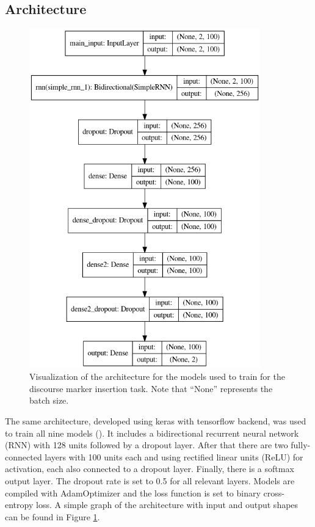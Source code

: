 \subsection{Architecture}

\begin{figure}
    \centering
    \includegraphics[width = 10cm]{Figures/graph.png}
    \caption{Visualization of the architecture for the models used to train for the discourse marker insertion task. Note that ``None'' represents the batch size.}
    \label{fig:disc-mark-architecture}
\end{figure}

The same architecture, developed using keras with tensorflow backend, was used to train all nine models (\cite{chollet2015keras}). It includes a bidirectional recurrent neural network (RNN) with 128 units followed by a dropout layer. After that there are two fully-connected layers with 100 units each and using rectified linear units (ReLU) for activation, each also connected to a dropout layer. Finally, there is a softmax output layer. The dropout rate is set to 0.5 for all relevant layers. Models are compiled with AdamOptimizer and the loss function is set to binary cross-entropy loss. A simple graph of the architecture with input and output shapes can be found in Figure \ref{fig:disc-mark-architecture}.

